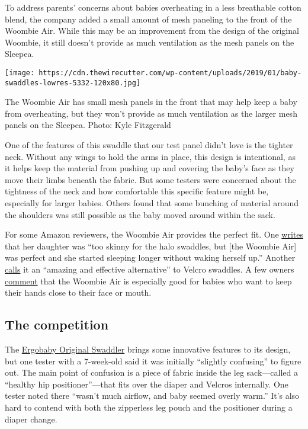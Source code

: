 To address parents' concerns about babies overheating in a less
breathable cotton blend, the company added a small amount of mesh
paneling to the front of the Woombie Air. While this may be an
improvement from the design of the original Woombie, it still doesn't
provide as much ventilation as the mesh panels on the Sleepea.

\texttt{[image: https://cdn.thewirecutter.com/wp-content/uploads/2019/01/baby-swaddles-lowres-5332-120x80.jpg]}

The Woombie Air has small mesh panels in the front that may help keep a
baby from overheating, but they won't provide as much ventilation as the
larger mesh panels on the Sleepea. Photo: Kyle Fitzgerald

One of the features of this swaddle that our test panel didn't love is
the tighter neck. Without any wings to hold the arms in place, this
design is intentional, as it helps keep the material from pushing up and
covering the baby's face as they move their limbs beneath the fabric.
But some testers were concerned about the tightness of the neck and how
comfortable this specific feature might be, especially for larger
babies. Others found that some bunching of material around the shoulders
was still possible as the baby moved around within the sack.

For some Amazon reviewers, the Woombie Air provides the perfect fit. One
\href{https://www.amazon.com/gp/customer-reviews/RNDZLITUTVIUR?tag=thewire06-20\&linkCode=xm2\&ascsubtag=YT78495}{writes}
that her daughter was ``too skinny for the halo swaddles, but {[}the
Woombie Air{]} was perfect and she started sleeping longer without
waking herself up.'' Another
\href{https://www.amazon.com/gp/customer-reviews/R1WJ74BWDXVPTN?tag=thewire06-20\&linkCode=xm2\&ascsubtag=YT78495}{calls}
it an ``amazing and effective alternative'' to Velcro swaddles. A few
owners
\href{https://www.amazon.com/gp/customer-reviews/R2RW741I3QUQRL?tag=thewire06-20\&linkCode=xm2\&ascsubtag=YT78495}{comment}
that the Woombie Air is especially good for babies who want to keep
their hands close to their face or mouth.

\hypertarget{the-competition}{%
\subsection{The competition}\label{the-competition}}

The
\href{https://www.nytimes3xbfgragh.onion/wirecutter/out/link/30690/150981/4/86639/?merchant=Amazon}{Ergobaby
Original Swaddler} brings some innovative features to its design, but
one tester with a 7-week-old said it was initially ``slightly
confusing'' to figure out. The main point of confusion is a piece of
fabric inside the leg sack---called a ``healthy hip positioner''---that
fits over the diaper and Velcros internally. One tester noted there
``wasn't much airflow, and baby seemed overly warm.'' It's also hard to
contend with both the zipperless leg pouch and the positioner during a
diaper change.

